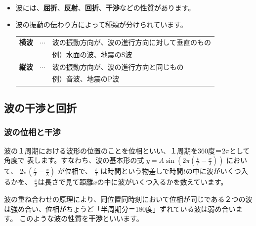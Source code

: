 \begin{itemize}

\item 波には、{\bf 屈折}、{\bf 反射}、{\bf 回折}、{\bf 干渉}などの性質があります。

\item 波の振動の伝わり方によって種類が分けられています。
\begin{center}
\begin{tabular}{rcl}
{\bf 横波} &$\cdots$& 波の振動方向が、波の進行方向に対して垂直のもの\\
&& 例）水面の波、地震のS波\\
{\bf 縦波} & $\cdots$ &波の振動方向が、波の進行方向と同じもの\\
&& 例）音波、地震のP波
\end{tabular}
\end{center}

\end{itemize}


\subsection{波の干渉と回折}

\subsubsection{波の位相と干渉}


波の１周期における波形の位置のことを位相といい、１周期を360度＝$2\pi$として角度で 
表します。すなわち、波の基本形の式
$y=A\sin\left(2\pi\left(\frac{t}{T}-\frac{x}{\lambda}\right)\right)$
において、 
$
2\pi\left(\frac{t}{T}-\frac{x}{\lambda}\right)
$
が位相で、 
$
\frac{t}{T}
$
は時間という物差しで時間$t$の中に波がいくつ入るかを、
$\frac{x}{\lambda}$は長さで見て距離$x$の中に波がいくつ入るかを数えています。

波の重ね合わせの原理により、同位置同時刻において位相が同じである２つの波は強め合い、位相がちょうど「半周期分＝180度」ずれている波は弱め合います。
このような波の性質を{\bf 干渉}といいます。


